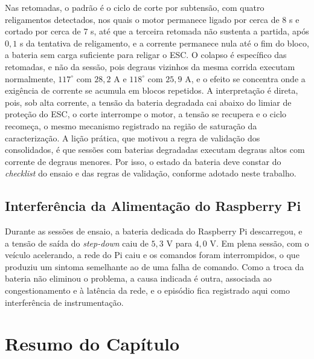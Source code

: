 Nas retomadas, o padrão é o ciclo de corte por
subtensão, com quatro religamentos detectados, nos quais o motor permanece ligado por cerca
de $8$ s e cortado por cerca de $7$ s, até que a terceira retomada não sustenta a partida,
após $0{,}1$ s da tentativa de religamento, e a corrente permanece nula até o fim do
bloco, a bateria sem carga suficiente para
religar o ESC. O colapso é específico das retomadas, e não da sessão, pois degraus
vizinhos da mesma corrida executam normalmente, $117^\circ$ com $28{,}2$ A e $118^\circ$
com $25{,}9$ A, e o efeito se concentra onde a exigência de corrente
se acumula em blocos repetidos. A interpretação é direta, pois, sob alta corrente, a tensão da
bateria degradada cai abaixo do limiar de proteção do ESC, o corte interrompe o motor, a
tensão se recupera e o ciclo recomeça, o mesmo mecanismo registrado na região de
saturação da caracterização. A lição prática, que motivou a regra de validação dos
consolidados, é que sessões com baterias degradadas executam degraus altos com corrente de
degraus menores. Por isso, o estado da bateria deve constar do \emph{checklist} do ensaio e
das regras de validação, conforme adotado neste trabalho.

\subsection{Interferência da Alimentação do Raspberry Pi}
\label{sec:bateria_pi}

Durante as sessões de ensaio, a bateria dedicada do Raspberry Pi descarregou, e a tensão de
saída do \emph{step-down} caiu de $5{,}3$ V para $4{,}0$ V. Em plena sessão, com o veículo
acelerando, a rede do Pi caiu e os comandos foram interrompidos, o que produziu um sintoma
semelhante ao de uma falha de comando. Como a troca da bateria não eliminou o problema, a
causa indicada é outra, associada ao congestionamento e à latência da rede, e o episódio
fica registrado aqui como interferência de instrumentação.

\section{Resumo do Capítulo}
\label{sec:resumo}

